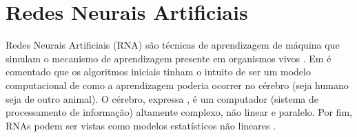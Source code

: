 \documentclass{automatextcc}
\begin{document}
\section{Redes Neurais Artificiais}

Redes Neurais Artificiais (RNA) são técnicas de aprendizagem de máquina que simulam o mecanismo de aprendizagem presente em organismos vivos \citep{aggarwal2018}. Em \citet{goodfellow2016} é comentado que os algoritmos iniciais tinham o intuito de ser um modelo computacional de como a aprendizagem poderia ocorrer no cérebro (seja humano seja de outro animal). O cérebro, expressa \citet{haykin2001}, é um computador (sistema de processamento de informação) altamente complexo, não linear e paralelo. Por fim, RNAs podem ser vistas como modelos estatísticos não lineares \citep{hastie2009}.
\end{document}
